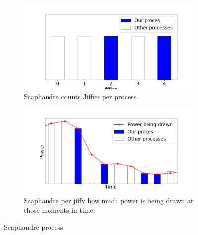 \documentclass[../thesis.tex]{subfiles}
\begin{document}
\begin{figure}[!hb]
    \begin{subfigure}{.475\linewidth}
            \includegraphics[width=\textwidth]{Thesis/Images/Scaphandre1/scaphandre1.png}
            \caption{Scaphandre counts Jiffies per process.\newline}
            \label{fig:scaphandre1}
    \end{subfigure}\hfill %
    \begin{subfigure}{.475\linewidth}
            \includegraphics[width=\textwidth]{Thesis/Images/Scaphandre1/scaphandre2.png}
            \caption{Scaphandre per jiffy how much power is being drawn at those moments in time.}
            \label{fig:scaphandre2}
    \end{subfigure}
    

    \caption{Scaphandre process}
    \label{fig:scaphandre_process}
\end{figure}
\end{document}
